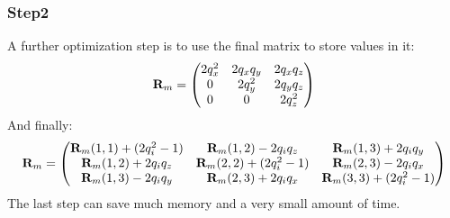 \subsubsection*{Step2}
A further optimization step is to use the final matrix to store values in it:
\begin{equation}
\mathbf{R}_m = \begin{pmatrix}
2q_x^2	& 2q_xq_y	& 2q_xq_z\\
0		& 2q_y^2	& 2q_yq_z\\
0		& 0			& 2q_z^2
\end{pmatrix}
\end{equation}
And finally:
\begin{equation}
\mathbf{R}_m = \begin{pmatrix}
\mathbf{R}_m(1,1) + (2q_i^2-1)	& \mathbf{R}_m(1,2) - 2q_iq_z		& \mathbf{R}_m(1,3) + 2q_iq_y	\\
\mathbf{R}_m(1,2) + 2q_iq_z		& \mathbf{R}_m(2,2) + (2q_i^2-1)	& \mathbf{R}_m(2,3) - 2q_iq_x	\\
\mathbf{R}_m(1,3) - 2q_iq_y		& \mathbf{R}_m(2,3) + 2q_iq_x		& \mathbf{R}_m(3,3) + (2q_i^2-1)
\end{pmatrix}
\end{equation}
The last step can save much memory and a very small amount of time.